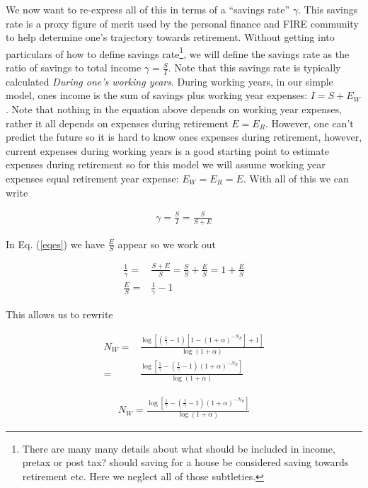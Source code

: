 \documentclass[12pt]{article}
\begin{document}
We now want to re-express all of this in terms of a ``savings rate'' $\gamma$.
This savings rate is a proxy figure of merit used by the personal finance and FIRE community to help determine one's trajectory towards retirement.
Without getting into particulars of how to define savings rate\footnote{There are many many details about what should be included in income, pretax or post tax? should saving for a house be considered saving towards retirement etc. Here we neglect all of those subtleties.}, we will define the savings rate as the ratio of savings to total income $\gamma = \frac{S}{I}$.
Note that this savings rate is typically calculated \textit{During one's working years}. 
During working years, in our simple model, ones income is the sum of savings plus working year expenses: $I = S+E_W$.
Note that nothing in the equation above depends on working year expenses, rather it all depends on expenses during retirement $E = E_R$.
However, one can't predict the future so it is hard to know ones expenses during retirement, however, current expenses during working years is a good starting point to estimate expenses during retirement so for this model we will assume working year expenses equal retirement year expense: $E_W = E_R = E$.
With all of this we can write

\begin{align}
\gamma = \frac{S}{I} = \frac{S}{S+E}
\end{align}

In Eq. (\ref{eqes}) we have $\frac{E}{S}$ appear so we work out

\begin{align}
\frac{1}{\gamma} =& \frac{S+E}{S} = \frac{S}{S} + \frac{E}{S} = 1 + \frac{E}{S}\\
\frac{E}{S} =&\frac{1}{\gamma} - 1
\end{align}

This allows us to rewrite

\begin{align}
N_W =& \frac{\log \left[\left(\frac{1}{\gamma}-1\right) \left[1-(1+\alpha)^{-N_R}\right] + 1\right]}{\log(1+\alpha)}\\
=& \frac{\log\left[\frac{1}{\gamma} - \left(\frac{1}{\gamma} - 1\right)(1+\alpha)^{-N_R}\right]}{\log(1+\alpha)}
\end{align}

\begin{align}
\label{eqworkyears}
\boxed{
N_W = \frac{\log\left[\frac{1}{\gamma} - \left(\frac{1}{\gamma} - 1\right)(1+\alpha)^{-N_R}\right]}{\log(1+\alpha)}
}
\end{align}
\end{document}

